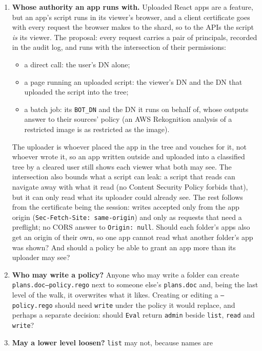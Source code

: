 \begin{enumerate}
\item \textbf{Whose authority an app runs with.} Uploaded React apps are a
  feature, but an app's script runs in its viewer's browser, and a client
  certificate goes with every request the browser makes to the shard, so to the
  APIs the script \emph{is} its viewer. The proposal: every request carries a
  pair of principals, recorded in the audit log, and runs with the intersection
  of their permissions:
  \begin{itemize}\tightlist
  \item a direct call: the user's DN alone;
  \item a page running an uploaded script: the viewer's DN and the DN that
    uploaded the script into the tree;
  \item a batch job: its \texttt{BOT\_DN} and the DN it runs on behalf of, whose
    outputs answer to their sources' policy (an AWS Rekognition analysis of a
    restricted image is as restricted as the image).
  \end{itemize}
  The uploader is whoever placed the app in the tree and vouches for it, not
  whoever wrote it, so an app written outside and uploaded into a classified tree
  by a cleared user still shows each viewer what both may see. The intersection
  also bounds what a script can leak: a script that reads can navigate away with
  what it read (no Content Security Policy forbids that), but it can only read
  what its uploader could already see. The rest follows from the certificate
  being the session: writes accepted only from the app origin
  (\texttt{Sec-Fetch-Site: same-origin}) and only as requests that need a
  preflight; no CORS answer to \texttt{Origin: null}. Should each folder's apps
  also get an origin of their own, so one app cannot read what another folder's
  app was shown? And should a policy be able to grant an app more than its
  uploader may see?
\item \textbf{Who may write a policy?} Anyone who may write a folder can create
  \texttt{plans.doc--policy.rego} next to someone else's \texttt{plans.doc} and,
  being the last level of the walk, it overwrites what it likes. Creating or
  editing a \texttt{--policy.rego} should need \texttt{write} under the policy it
  would replace, and perhaps a separate decision: should \texttt{Eval} return
  \texttt{admin} beside \texttt{list}, \texttt{read} and \texttt{write}?
\item \textbf{May a lower level loosen?} \texttt{list} may not, because names are

\end{enumerate}
